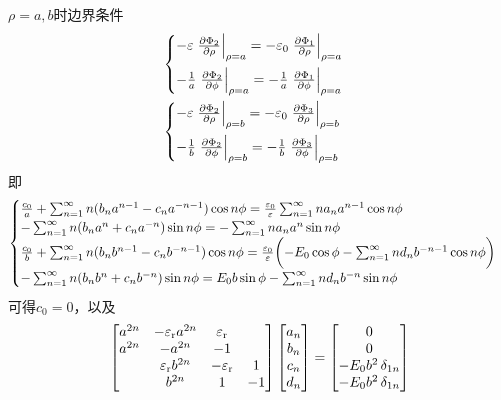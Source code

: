 $\rho=a,b$时边界条件
\begin{align}
    &\begin{cases}
        -\varepsilon\edg{\pv{\Phi_2}\rho}_{\rho=a}=-\varepsilon_0\edg{\pv{\Phi_1}\rho}_{\rho=a}\\[2ex]
        -\frac1a\edg{\pv{\Phi_2}\phi}_{\rho=a}=-\frac1a\edg{\pv{\Phi_1}\phi}_{\rho=a}
    \end{cases}\\
    &\begin{cases}
        -\varepsilon\edg{\pv{\Phi_2}\rho}_{\rho=b}=-\varepsilon_0\edg{\pv{\Phi_3}\rho}_{\rho=b}\\[2ex]
        -\frac1b\edg{\pv{\Phi_2}\phi}_{\rho=b}=-\frac1b\edg{\pv{\Phi_3}\phi}_{\rho=b}
    \end{cases}
\end{align}
即
{\footnotesize\begin{align}
    \begin{cases}
        \frac{c_0}a+\sum_{n=1}^{\infty}n(b_na^{n-1}-c_na^{-n-1})\cos n\phi=\frac{\varepsilon_0}\varepsilon\sum_{n=1}^{\infty} na_na^{n-1}\cos n\phi\\
        -\sum_{n=1}^{\infty}n(b_na^n+c_na^{-n})\sin n\phi=-\sum_{n=1}^{\infty}na_na^n\sin n\phi\\
        \frac{c_0}b+\sum_{n=1}^{\infty}n(b_nb^{n-1}-c_nb^{-n-1})\cos n\phi=\frac{\varepsilon_0}\varepsilon\biggl(-E_0\cos\phi-\sum_{n=1}^{\infty} nd_nb^{-n-1}\cos n\phi\biggr)\\
        -\sum_{n=1}^{\infty}n(b_nb^n+c_nb^{-n})\sin n\phi=E_0b\sin\phi-\sum_{n=1}^{\infty}nd_nb^{-n}\sin n\phi
    \end{cases}
\end{align}}
可得$c_0=0$，以及
\begin{equation}
    \begin{bmatrix}
        a^{2n}&-\varepsilon_\text r a^{2n}&\varepsilon_\text r\\
        a^{2n}&-a^{2n}&-1\\
        &\varepsilon_\text r b^{2n}&-\varepsilon_\text r&1\\
        &b^{2n}&1&-1
    \end{bmatrix}
    \begin{bmatrix}
        a_n\\b_n\\c_n\\d_n
    \end{bmatrix}=
    \begin{bmatrix}
        0\\0\\-E_0b^2\mathop{}\!\delta_{1n}\\-E_0b^2\mathop{}\!\delta_{1n}
    \end{bmatrix}
\end{equation}
